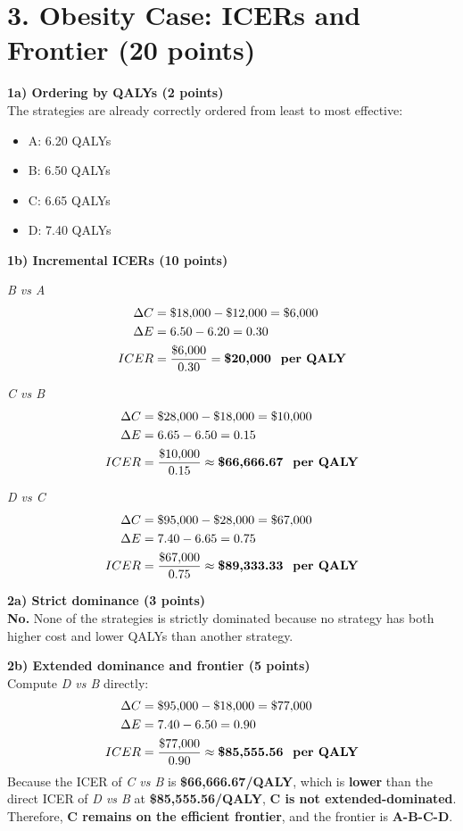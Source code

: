 \documentclass[11pt, letterpaper]{article}
\begin{document}
\section*{3. Obesity Case: ICERs and Frontier (20 points)}

\textbf{1a) Ordering by QALYs (2 points)} \\
The strategies are already correctly ordered from least to most effective:
\begin{itemize}[leftmargin=*]
    \item A: 6.20 QALYs
    \item B: 6.50 QALYs
    \item C: 6.65 QALYs
    \item D: 7.40 QALYs
\end{itemize}

\textbf{1b) Incremental ICERs (10 points)}

\textit{B vs A}
\begin{align*}
\Delta C &= \$18{,}000 - \$12{,}000 = \$6{,}000 \\
\Delta E &= 6.50 - 6.20 = 0.30 \\
ICER &= \frac{\$6{,}000}{0.30} = \textbf{\$20{,}000 \text{ per QALY}}
\end{align*}

\textit{C vs B}
\begin{align*}
\Delta C &= \$28{,}000 - \$18{,}000 = \$10{,}000 \\
\Delta E &= 6.65 - 6.50 = 0.15 \\
ICER &= \frac{\$10{,}000}{0.15} \approx \textbf{\$66{,}666.67 \text{ per QALY}}
\end{align*}

\textit{D vs C}
\begin{align*}
\Delta C &= \$95{,}000 - \$28{,}000 = \$67{,}000 \\
\Delta E &= 7.40 - 6.65 = 0.75 \\
ICER &= \frac{\$67{,}000}{0.75} \approx \textbf{\$89{,}333.33 \text{ per QALY}}
\end{align*}

\textbf{2a) Strict dominance (3 points)} \\
\textbf{No.} None of the strategies is strictly dominated because no strategy has both higher cost and lower QALYs than another strategy.

\textbf{2b) Extended dominance and frontier (5 points)} \\
Compute \textit{D vs B} directly:
\begin{align*}
\Delta C &= \$95{,}000 - \$18{,}000 = \$77{,}000 \\
\Delta E &= 7.40 - 6.50 = 0.90 \\
ICER &= \frac{\$77{,}000}{0.90} \approx \textbf{\$85{,}555.56 \text{ per QALY}}
\end{align*}
Because the ICER of \textit{C vs B} is \textbf{\$66,666.67/QALY}, which is \textbf{lower} than the direct ICER of \textit{D vs B} at \textbf{\$85,555.56/QALY}, \textbf{C is not extended-dominated}. Therefore, \textbf{C remains on the efficient frontier}, and the frontier is \textbf{A-B-C-D}.
\end{document}
